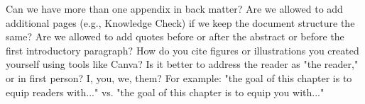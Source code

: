 Can we have more than one appendix in back matter?
Are we allowed to add additional pages (e.g., Knowledge Check) if we keep the document structure the same?
Are we allowed to add quotes before or after the abstract or before the first introductory paragraph?
How do you cite figures or illustrations you created yourself using tools like Canva?
Is it better to address the reader as "the reader," or in first person? I, you, we, them? For example: "the goal of this chapter is to equip readers with..." vs. "the goal of this chapter is to equip you with..."